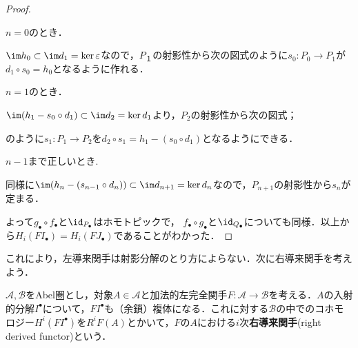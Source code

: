 \begin{proof}
\begin{step}
	\item $n=0$のとき．
	
	$\im h_0\subset\im d_1=\ker\varepsilon$なので，$P_１$の射影性から次の図式のように$s_0:P_0\to P_1$が$d_1\circ s_0=h_0$となるように作れる．
	
	\begin{figure}[H]
		\centering
		\caption{}
	\end{figure}

	\item $n=1$のとき．
	
	$\im (h_1-s_0\circ d_1)\subset\im d_2=\ker d_1$より，$P_2$の射影性から次の図式；
	
	\begin{figure}[H]
		\centering
		\caption{}
	\end{figure}
	
	のように$s_1:P_1\to P_2$を$d_2\circ s_1=h_1-(s_0\circ d_1)$となるようにできる．

	\item $n-1$まで正しいとき.
	
	同様に$\im (h_n-(s_{n-1}\circ d_n))\subset \im d_{n+1}=\ker d_n$なので，$P_{n+1}$の射影性から$s_n$が定まる．
\end{step}


よって$g_\bullet\circ f_\bullet$と$\id_{P_\bullet}$はホモトピックで， $f_\bullet\circ g_\bullet$と$\id_{Q_\bullet}$についても同様．以上から$H_i(FI_\bullet)=H_i(FJ_\bullet)$であることがわかった．
\end{proof}

これにより，左導来関手は射影分解のとり方によらない．次に右導来関手を考えよう．

\begin{defi}[右導来関手]
	$\mathscr{A,B}$をAbel圏とし，対象$A\in\mathscr{A}$と加法的左完全関手$F:\mathscr{A}\to\mathscr{B}$を考える．$A$の入射的分解$I^\bullet$について，$F I^\bullet$も（余鎖）複体になる．これに対する$\mathscr{B}$の中でのコホモロジー$H^i(F I^\bullet)$を$R^i F (A)$とかいて，$F$の$A$における$i$次\textbf{右導来関手}(right derived functor)という．
\end{defi}

